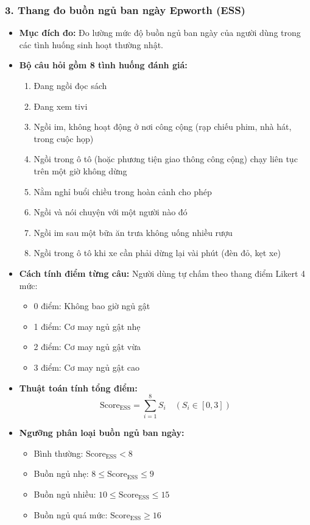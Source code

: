 \documentclass[12pt,a4paper]{article}
\begin{document}
\subsubsection*{3. Thang đo buồn ngủ ban ngày Epworth (ESS)}
\begin{itemize}
    \item \textbf{Mục đích đo:} Đo lường mức độ buồn ngủ ban ngày của người dùng trong các tình huống sinh hoạt thường nhật.
    \item \textbf{Bộ câu hỏi gồm 8 tình huống đánh giá:}
    \begin{enumerate}
        \item Đang ngồi đọc sách
        \item Đang xem tivi
        \item Ngồi im, không hoạt động ở nơi công cộng (rạp chiếu phim, nhà hát, trong cuộc họp)
        \item Ngồi trong ô tô (hoặc phương tiện giao thông công cộng) chạy liên tục trên một giờ không dừng
        \item Nằm nghỉ buổi chiều trong hoàn cảnh cho phép
        \item Ngồi và nói chuyện với một người nào đó
        \item Ngồi im sau một bữa ăn trưa không uống nhiều rượu
        \item Ngồi trong ô tô khi xe cần phải dừng lại vài phút (đèn đỏ, kẹt xe)
    \end{enumerate}
    \item \textbf{Cách tính điểm từng câu:} Người dùng tự chấm theo thang điểm Likert 4 mức:
    \begin{itemize}
        \item 0 điểm: Không bao giờ ngủ gật
        \item 1 điểm: Cơ may ngủ gật nhẹ
        \item 2 điểm: Cơ may ngủ gật vừa
        \item 3 điểm: Cơ may ngủ gật cao
    \end{itemize}
    \item \textbf{Thuật toán tính tổng điểm:}
    \begin{equation}
        \text{Score}_{\text{ESS}} = \sum_{i=1}^{8} S_i \quad (S_i \in [0, 3])
    \end{equation}
    \item \textbf{Ngưỡng phân loại buồn ngủ ban ngày:}
    \begin{itemize}
        \item Bình thường: $\text{Score}_{\text{ESS}} < 8$
        \item Buồn ngủ nhẹ: $8 \le \text{Score}_{\text{ESS}} \le 9$
        \item Buồn ngủ nhiều: $10 \le \text{Score}_{\text{ESS}} \le 15$
        \item Buồn ngủ quá mức: $\text{Score}_{\text{ESS}} \ge 16$
    \end{itemize}
\end{itemize}
\end{document}
